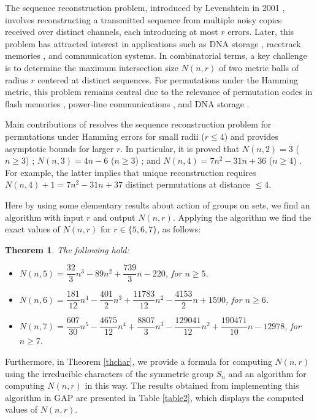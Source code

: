 \documentclass{amsart}
\newtheorem{thm}{Theorem}[section]
\numberwithin{equation}{section}
\begin{document}
The sequence reconstruction problem, introduced by Levenshtein in 2001 \cite{[14], [15]},
involves reconstructing a transmitted sequence from multiple noisy copies received over distinct channels, each introducing at most $r$ errors. Later, this problem has attracted interest in applications such as  DNA storage \cite{[3],[13]}, racetrack memories \cite{[2]}, and communication systems. In combinatorial terms, a key challenge is to determine the maximum intersection size  $N(n, r)$ of two metric balls of radius $r$ centered at distinct sequences. For permutations under the Hamming metric, this problem remains central due to the relevance of permutation codes in flash memories \cite{[8]}, power-line communications \cite{[18],[22]}, and DNA storage \cite{[1],[19]}.  

Main contributions of \cite{WFK} resolves the sequence reconstruction problem for permutations under Hamming errors for small radii ($r \leq 4$) and provides asymptotic bounds for larger $r$. In particular,  it is proved that $N(n, 2) = 3$ ($n \geq 3$) \cite[Theorem 4]{WFK}; $N(n, 3) = 4n - 6$ ($n \geq 3$) \cite[Theorem 5]{WFK}; and $N(n, 4) = 7n^2 - 31n + 36$ ($n \geq 4$)  \cite[Theorem 6]{WFK}. For example, the latter implies that unique reconstruction requires $N(n,4)+1=7n^2 - 31n + 37$ distinct permutations at distance $\leq 4$.     

Here by using some elementary results about action of groups on sets, we find an algorithm with input $r$ and output $N(n,r)$. Applying the algorithm we find the exact values of $N(n,r)$ for $r\in \{5,6,7\}$, as follows:
\begin{thm}\label{th5}
 The following hold:
\begin{itemize}
\item[(i)]  $ N(n,5) = \dfrac{32}{3}n^3 - 89n^2 + \dfrac{739}{3}n - 220$, for  $ n \geq 5$.
\item[(ii)] $ N(n,6) = \dfrac{181}{12}n^4 - \dfrac{401}{2}n^3 + \dfrac{11783}{12}n^2 - \dfrac{4153}{2}n + 1590$,  for  $ n \geq 6$.
\item[(iii)] $N(n,7)= \dfrac{607}{30}n^5 - \dfrac{4675}{12}n^4 + \dfrac{8807}{3}n^3 - \dfrac{129041}{12}n^2 + \dfrac{190471}{10}n - 12978$, for $ n \geq 7$.
\end{itemize}
\end{thm}
Furthermore, in Theorem  \ref{thchar}, we provide a formula for computing $N(n,r)$ using the irreducible characters of the symmetric group $S_n$ and an algorithm for computing \(N(n,r)\) in this way. The results obtained from implementing this algorithm in \textsf{GAP} \cite{GAP} are presented in Table \ref{table2}, which displays the computed values of $N(n,r)$.
\end{document}
